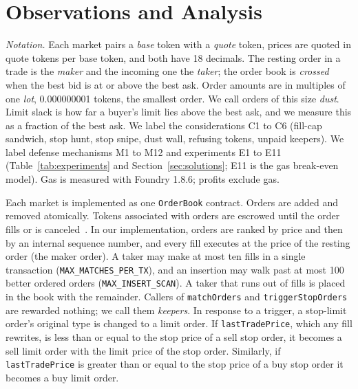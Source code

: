 \section{Observations and Analysis}\label{sec:analysis}

\emph{Notation.}
Each market pairs a \emph{base} token with a \emph{quote} token, prices are quoted in quote tokens per base token, and both have 18 decimals. %
The resting order in a trade is the \emph{maker} and the incoming one the \emph{taker}; the order book is \emph{crossed} when the best bid is at or above the best ask. %
Order amounts are in multiples of one \emph{lot}, 0.000000001 tokens, the smallest order. We call orders of this size \emph{dust}.
Limit slack is how far a buyer's limit lies above the best ask, and we measure this as a fraction of the best ask. %
We label the considerations C1 to C6 (fill-cap sandwich, stop hunt, stop snipe, dust wall, refusing tokens, unpaid keepers). %
We label defense mechanisms M1 to M12 and experiments E1 to E11 (Table~\ref{tab:experiments} and Section~\ref{sec:solutions}; E11 is the gas break-even model). %
Gas is measured with Foundry 1.8.6; profits exclude gas. %

Each market is implemented as one \texttt{OrderBook} contract. Orders are added and removed atomically.
Tokens associated with orders are escrowed until the order fills or is canceled~\cite{repo8753521}. %
In our implementation, orders are ranked by price and then by an internal sequence number, and every fill executes at the price of the resting order (the maker order). %
A taker may make at most ten fills in a single transaction (\texttt{MAX\_MATCHES\_PER\_TX}), and an insertion may walk past at most 100 better ordered orders (\texttt{MAX\_INSERT\_SCAN}). %
A taker that runs out of fills is placed in the book with the remainder. %
Callers of \texttt{matchOrders} and \texttt{triggerStopOrders} are rewarded nothing; we call them \emph{keepers}. %
In response to a trigger, a stop-limit order's original type is changed to a limit order.
If \texttt{lastTradePrice}, which any fill rewrites, is less than or equal to the stop price of a sell stop order, it becomes a sell limit order with the limit price of the stop order. %
Similarly, if \texttt{lastTradePrice} is greater than or equal to the stop price of a buy stop order it becomes a buy limit order.

